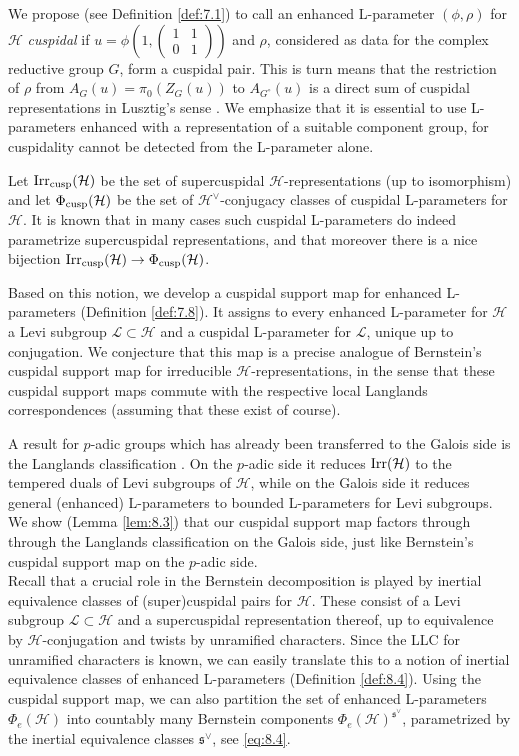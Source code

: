 \documentclass[11pt]{amsart}
\theoremstyle{definition}
\newcommand{\matje}[4]{\left(\begin{smallmatrix} #1 & #2 \\ 
#3 & #4 \end{smallmatrix}\right)}
\def\Irr{{\rm Irr}}
\def\cL{{\mathcal L}}
\def\cH{{\mathcal H}}
\def\fs{{\mathfrak s}}
\def\cusp{{\rm cusp}}
\begin{document}
We propose (see Definition \ref{def:7.1}) to call an enhanced L-parameter
$(\phi,\rho)$ for $\cH$ \emph{cuspidal} if $u = \phi (1,\matje{1}{1}{0}{1})$ and $\rho$,
considered as data for the complex reductive group $G$,
form a cuspidal pair. This is turn means that the restriction of $\rho$ from
$A_G (u) = \pi_0 (Z_G (u))$ to $A_{G^\circ}(u)$ is a direct sum of cuspidal
representations in Lusztig's sense \cite{Lus1}. We emphasize that it is essential 
to use L-parameters enhanced with a representation of a suitable component group, 
for cuspidality cannot be detected from the L-parameter alone.

Let $\Irr_\cusp (\cH)$ be the set of supercuspidal $\cH$-representations (up to
isomorphism) and let $\Phi_\cusp (\cH)$ be the set of $\cH^\vee$-conjugacy 
classes of cuspidal L-parameters for $\cH$. It is known that in many cases
such cuspidal L-parameters do indeed parametrize supercuspidal representations, and
that moreover there is a nice bijection $\Irr_\cusp (\cH) \to \Phi_\cusp (\cH)$.

Based on this notion, we develop a cuspidal support map for enhanced L-parameters
(Definition \ref{def:7.8}). It assigns to every enhanced L-parameter for $\cH$ a
Levi subgroup $\cL \subset \cH$ and a cuspidal L-parameter for $\cL$, unique up 
to conjugation. We conjecture that this map is a precise analogue of Bernstein's
cuspidal support map for irreducible $\cH$-representations, in the sense that 
these cuspidal support maps commute with the respective local Langlands 
correspondences (assuming that these exist of course). 

A result for $p$-adic groups which has already been transferred to the Galois
side is the Langlands classification \cite{SiZi}. On the $p$-adic side it
reduces $\Irr (\cH)$ to the tempered duals of Levi subgroups of $\cH$, while
on the Galois side it reduces general (enhanced) L-parameters to bounded L-parameters
for Levi subgroups. We show (Lemma \ref{lem:8.3}) that our cuspidal support map
factors through through the Langlands classification on the Galois side, just 
like Bernstein's cuspidal support map on the $p$-adic side.\\

Recall that a crucial role in the Bernstein decomposition is played by inertial
equivalence classes of (super)cuspidal pairs for $\cH$. These consist of a Levi subgroup
$\cL \subset \cH$ and a supercuspidal representation thereof, up to equivalence by
$\cH$-conjugation and twists by unramified characters. Since the LLC for unramified
characters is known, we can easily translate this to a notion of inertial equivalence
classes of enhanced L-parameters (Definition \ref{def:8.4}). Using the cuspidal
support map, we can also partition the set of enhanced L-parameters $\Phi_e (\cH)$
into countably many Bernstein components $\Phi_e (\cH)^{\fs^\vee}$, parametrized
by the inertial equivalence classes $\fs^\vee$, see \eqref{eq:8.4}. 
\end{document}
